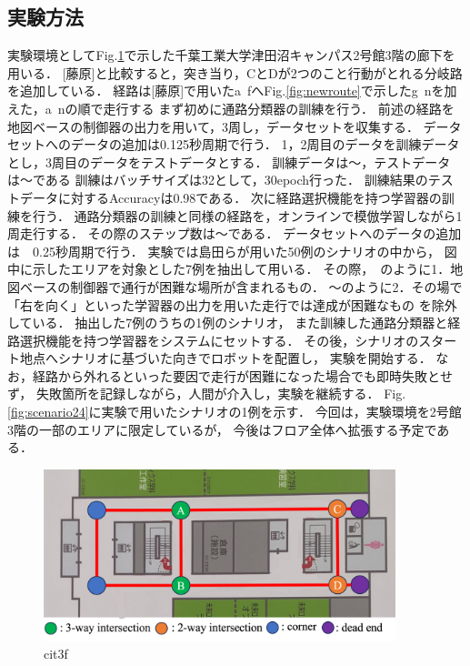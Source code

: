 \documentclass{sice-si}
\begin{document}
\subsection{実験方法}
実験環境としてFig.\ref{fig:cit3f}で示した千葉工業大学津田沼キャンパス2号館3階の廊下を用いる．
[藤原]と比較すると，突き当り，CとDが2つのこと行動がとれる分岐路を追加している．
経路は[藤原]で用いたa~fへFig.\ref{fig:newroute}で示したg~nを加えた，a~nの順で走行する
まず初めに通路分類器の訓練を行う．
前述の経路を地図ベースの制御器の出力を用いて，3周し，データセットを収集する．
データセットへのデータの追加は0.125秒周期で行う．
1，2周目のデータを訓練データとし，3周目のデータをテストデータとする．
訓練データは〜，テストデータは〜である
訓練はバッチサイズは32として，30epoch行った．
訓練結果のテストデータに対するAccuracyは0.98である．
次に経路選択機能を持つ学習器の訓練を行う．
通路分類器の訓練と同様の経路を，オンラインで模倣学習しながら1周走行する．
その際のステップ数は〜である．
データセットへのデータの追加は　0.25秒周期で行う．
実験では島田らが用いた50例のシナリオの中から，
図中に示したエリアを対象とした7例を抽出して用いる．
その際，~のように1．地図ベースの制御器で通行が困難な場所が含まれるもの．
〜のように2．その場で「右を向く」といった学習器の出力を用いた走行では達成が困難なもの
を除外している．
抽出した7例のうちの1例のシナリオ，
また訓練した通路分類器と経路選択機能を持つ学習器をシステムにセットする．
その後，シナリオのスタート地点へシナリオに基づいた向きでロボットを配置し，
実験を開始する．
なお，経路から外れるといった要因で走行が困難になった場合でも即時失敗とせず，
失敗箇所を記録しながら，人間が介入し，実験を継続する．
Fig.\ref{fig:scenario24}に実験で用いたシナリオの1例を示す．
今回は，実験環境を2号館3階の一部のエリアに限定しているが，
今後はフロア全体へ拡張する予定である．
\begin{figure}[h!]
    \centering
     \includegraphics[height=50mm]{./figs/keiro.png}
     \caption{cit3f}\label{fig:cit3f}
\end{figure}
\end{document}
